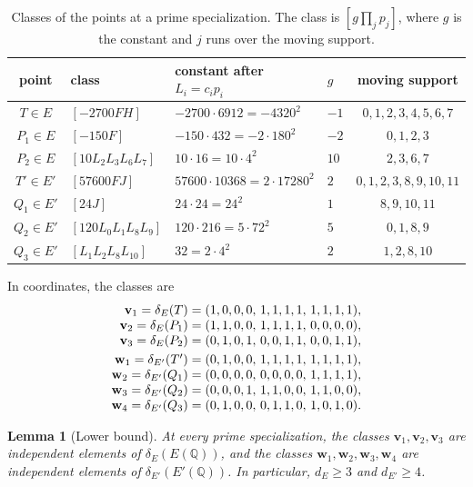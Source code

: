 \documentclass[12pt,oneside,openany]{book}
\theoremstyle{definition}
\theoremstyle{plain}
\numberwithin{equation}{chapter}
\theoremstyle{plain}
\newtheorem{lemma}[lemma]{Lemma}
\theoremstyle{definition}
\theoremstyle{remark}
\newcommand{\Q}{\mathbb Q}
\newcommand{\sq}[1]{[#1]}
\begin{document}
\begin{table}[htbp]
\centering
\caption{Classes of the points at a prime specialization. The class is $\sq{g\prod_{j}p_j}$, where $g$ is the constant and $j$ runs over the moving support.}\label{tab:r5-classes}
\begin{tabular}{clllc}
\toprule
point & class & constant after $L_i=c_ip_i$ & $g$ & moving support\\
\midrule
$T\in E$ & $\sq{-2700FH}$ & $-2700\cdot6912=-4320^2$ & $-1$ & $0,1,2,3,4,5,6,7$\\
$P_1\in E$ & $\sq{-150F}$ & $-150\cdot432=-2\cdot180^2$ & $-2$ & $0,1,2,3$\\
$P_2\in E$ & $\sq{10L_2L_3L_6L_7}$ & $10\cdot16=10\cdot4^2$ & $10$ & $2,3,6,7$\\
\midrule
$T'\in E'$ & $\sq{57600FJ}$ & $57600\cdot10368=2\cdot17280^2$ & $2$ & $0,1,2,3,8,9,10,11$\\
$Q_1\in E'$ & $\sq{24J}$ & $24\cdot24=24^2$ & $1$ & $8,9,10,11$\\
$Q_2\in E'$ & $\sq{120L_0L_1L_8L_9}$ & $120\cdot216=5\cdot72^2$ & $5$ & $0,1,8,9$\\
$Q_3\in E'$ & $\sq{L_1L_2L_8L_{10}}$ & $32=2\cdot4^2$ & $2$ & $1,2,8,10$\\
\bottomrule
\end{tabular}
\end{table}

In coordinates, the classes are
\begin{equation}\label{r5:class-vectors}
\begin{array}{r@{\;}c@{\;}l}
\mathbf v_1=\delta_E(T)&=&(1,0,0,0,\,1,1,1,1,\,1,1,1,1),\\
\mathbf v_2=\delta_E(P_1)&=&(1,1,0,0,\,1,1,1,1,\,0,0,0,0),\\
\mathbf v_3=\delta_E(P_2)&=&(0,1,0,1,\,0,0,1,1,\,0,0,1,1),\\[3pt]
\mathbf w_1=\delta_{E'}(T')&=&(0,1,0,0,\,1,1,1,1,\,1,1,1,1),\\
\mathbf w_2=\delta_{E'}(Q_1)&=&(0,0,0,0,\,0,0,0,0,\,1,1,1,1),\\
\mathbf w_3=\delta_{E'}(Q_2)&=&(0,0,0,1,\,1,1,0,0,\,1,1,0,0),\\
\mathbf w_4=\delta_{E'}(Q_3)&=&(0,1,0,0,\,0,1,1,0,\,1,0,1,0).
\end{array}
\end{equation}

\begin{lemma}[Lower bound]\label{lem:r5-lower}
At every prime specialization, the classes $\mathbf v_1,\mathbf v_2,\mathbf v_3$ are independent elements of $\delta_E(E(\Q))$, and the classes $\mathbf w_1,\mathbf w_2,\mathbf w_3,\mathbf w_4$ are independent elements of $\delta_{E'}(E'(\Q))$. In particular, $d_E\ge3$ and $d_{E'}\ge4$.
\end{lemma}
\end{document}
